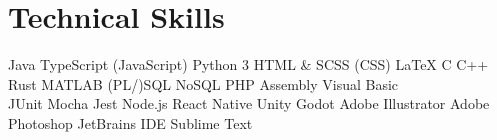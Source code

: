 \documentclass[]{deedy-resume-openfont}
\begin{document}
\section{Technical Skills}
Java \textbullet{} TypeScript (JavaScript) \textbullet{} Python 3 \textbullet{} HTML \& SCSS (CSS) \textbullet{} \LaTeX \textbullet{} C \textbullet{} C++ \textbullet{} Rust \textbullet{} MATLAB \textbullet{} (PL/)SQL \textbullet{} NoSQL \textbullet{} PHP \textbullet{} Assembly \textbullet{} Visual Basic\\
JUnit \textbullet{} Mocha \textbullet{} Jest \textbullet{} Node.js \textbullet{} React Native \textbullet{} Unity \textbullet{} Godot \textbullet{} Adobe Illustrator \textbullet{} Adobe Photoshop \textbullet{} JetBrains IDE \textbullet{} Sublime Text
\sectionsep
\end{document}
